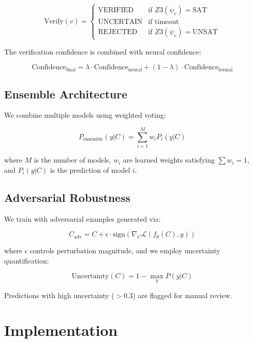 \documentclass[10pt,journal,compsoc]{IEEEtran}
\begin{document}
\begin{equation}
\text{Verify}(v) = \begin{cases}
\text{VERIFIED} & \text{if } Z3(\psi_v) = \text{SAT} \\
\text{UNCERTAIN} & \text{if } \text{timeout} \\
\text{REJECTED} & \text{if } Z3(\psi_v) = \text{UNSAT}
\end{cases}
\end{equation}

The verification confidence is combined with neural confidence:

\begin{equation}
\text{Confidence}_{\text{final}} = \lambda \cdot \text{Confidence}_{\text{neural}} + (1-\lambda) \cdot \text{Confidence}_{\text{formal}}
\end{equation}

\subsection{Ensemble Architecture}
We combine multiple models using weighted voting:

\begin{equation}
P_{\text{ensemble}}(y|C) = \sum_{i=1}^M w_i P_i(y|C)
\end{equation}

where $M$ is the number of models, $w_i$ are learned weights satisfying $\sum w_i = 1$, and $P_i(y|C)$ is the prediction of model $i$.

\subsection{Adversarial Robustness}
We train with adversarial examples generated via:

\begin{equation}
C_{\text{adv}} = C + \epsilon \cdot \text{sign}(\nabla_C \mathcal{L}(f_\theta(C), y))
\end{equation}

where $\epsilon$ controls perturbation magnitude, and we employ uncertainty quantification:

\begin{equation}
\text{Uncertainty}(C) = 1 - \max_y P(y|C)
\end{equation}

Predictions with high uncertainty ($> 0.3$) are flagged for manual review.

\section{Implementation}
\end{document}
